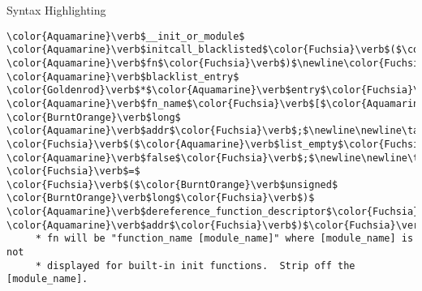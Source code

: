 \begin{frame}{Syntax Highlighting}
\begin{verbatim}
\color{Aquamarine}\verb$__init_or_module$ \color{Aquamarine}\verb$initcall_blacklisted$\color{Fuchsia}\verb$($\color{Aquamarine}\verb$initcall_t$ \color{Aquamarine}\verb$fn$\color{Fuchsia}\verb$)$\newline\color{Fuchsia}\verb${$\newline\tab\color{BurntOrange}\verb$struct$ \color{Aquamarine}\verb$blacklist_entry$ \color{Goldenrod}\verb$*$\color{Aquamarine}\verb$entry$\color{Fuchsia}\verb$;$\newline\tab\color{BurntOrange}\verb$char$ \color{Aquamarine}\verb$fn_name$\color{Fuchsia}\verb$[$\color{Aquamarine}\verb$KSYM_SYMBOL_LEN$\color{Fuchsia}\verb$]$\color{Fuchsia}\verb$;$\newline\tab\color{BurntOrange}\verb$unsigned$ \color{BurntOrange}\verb$long$ \color{Aquamarine}\verb$addr$\color{Fuchsia}\verb$;$\newline\newline\tab\color{BurntOrange}\verb$if$ \color{Fuchsia}\verb$($\color{Aquamarine}\verb$list_empty$\color{Fuchsia}\verb$($\color{Goldenrod}\verb$&$\color{Aquamarine}\verb$blacklisted_initcalls$\color{Fuchsia}\verb$)$\color{Fuchsia}\verb$)$\newline\tab\tab\color{BurntOrange}\verb$return$ \color{Aquamarine}\verb$false$\color{Fuchsia}\verb$;$\newline\newline\tab\color{Aquamarine}\verb$addr$ \color{Fuchsia}\verb$=$ \color{Fuchsia}\verb$($\color{BurntOrange}\verb$unsigned$ \color{BurntOrange}\verb$long$\color{Fuchsia}\verb$)$ \color{Aquamarine}\verb$dereference_function_descriptor$\color{Fuchsia}\verb$($\color{Aquamarine}\verb$fn$\color{Fuchsia}\verb$)$\color{Fuchsia}\verb$;$\newline\tab\color{Aquamarine}\verb$sprint_symbol_no_offset$\color{Fuchsia}\verb$($\color{Aquamarine}\verb$fn_name$\color{Fuchsia}\verb$,$ \color{Aquamarine}\verb$addr$\color{Fuchsia}\verb$)$\color{Fuchsia}\verb$;$\newline\newline\tab\color{Rhodamine}\begin{verbatim}/*
	 * fn will be "function_name [module_name]" where [module_name] is not
	 * displayed for built-in init functions.  Strip off the [module_name].

\end{verbatim}
\end{frame}
